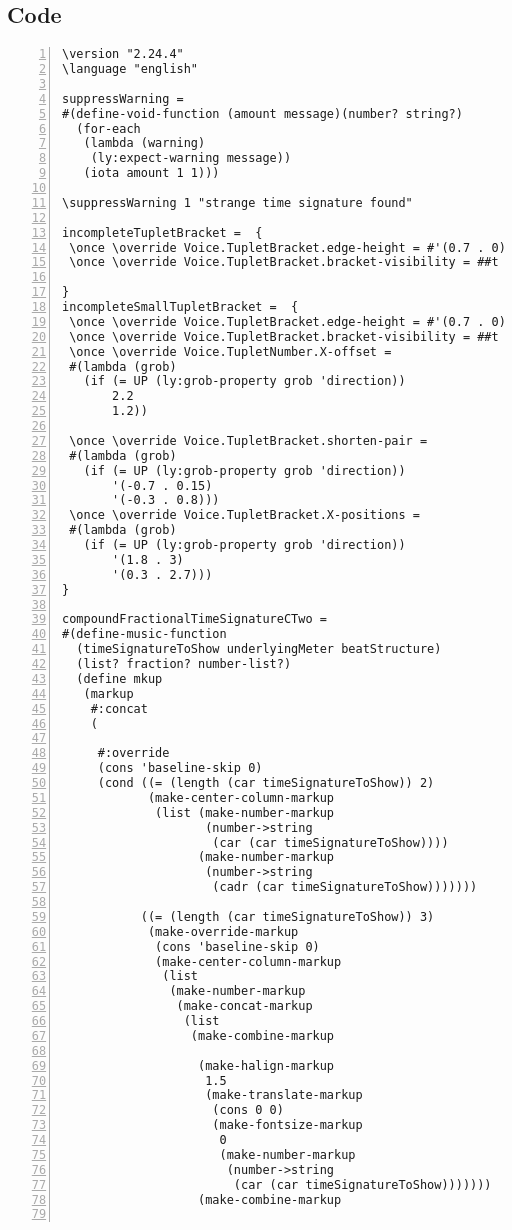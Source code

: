 \subsection{Code}
\begin{Verbatim}[numbers=left,xleftmargin=5mm]
\version "2.24.4"
\language "english"

suppressWarning =
#(define-void-function (amount message)(number? string?)
  (for-each
   (lambda (warning)
    (ly:expect-warning message))
   (iota amount 1 1)))

\suppressWarning 1 "strange time signature found"

incompleteTupletBracket =  {
 \once \override Voice.TupletBracket.edge-height = #'(0.7 . 0)
 \once \override Voice.TupletBracket.bracket-visibility = ##t

}
incompleteSmallTupletBracket =  {
 \once \override Voice.TupletBracket.edge-height = #'(0.7 . 0)
 \once \override Voice.TupletBracket.bracket-visibility = ##t
 \once \override Voice.TupletNumber.X-offset =
 #(lambda (grob)
   (if (= UP (ly:grob-property grob 'direction))
       2.2
       1.2))

 \once \override Voice.TupletBracket.shorten-pair =
 #(lambda (grob)
   (if (= UP (ly:grob-property grob 'direction))
       '(-0.7 . 0.15)
       '(-0.3 . 0.8)))
 \once \override Voice.TupletBracket.X-positions =
 #(lambda (grob)
   (if (= UP (ly:grob-property grob 'direction))
       '(1.8 . 3)
       '(0.3 . 2.7)))
}

compoundFractionalTimeSignatureCTwo =
#(define-music-function
  (timeSignatureToShow underlyingMeter beatStructure)
  (list? fraction? number-list?)
  (define mkup
   (markup
    #:concat
    (

     #:override
     (cons 'baseline-skip 0)
     (cond ((= (length (car timeSignatureToShow)) 2)
            (make-center-column-markup
             (list (make-number-markup
                    (number->string
                     (car (car timeSignatureToShow))))
                   (make-number-markup
                    (number->string
                     (cadr (car timeSignatureToShow)))))))

           ((= (length (car timeSignatureToShow)) 3)
            (make-override-markup
             (cons 'baseline-skip 0)
             (make-center-column-markup
              (list
               (make-number-markup
                (make-concat-markup
                 (list
                  (make-combine-markup

                   (make-halign-markup
                    1.5
                    (make-translate-markup
                     (cons 0 0)
                     (make-fontsize-markup
                      0
                      (make-number-markup
                       (number->string
                        (car (car timeSignatureToShow)))))))
                   (make-combine-markup


\end{Verbatim}
